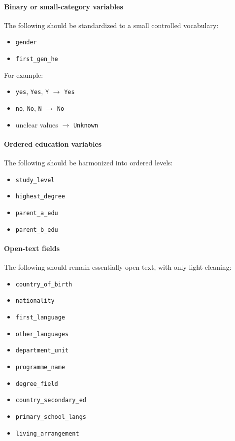 \documentclass[11pt]{article}
\begin{document}
\paragraph{Binary or small-category variables}
The following should be standardized to a small controlled vocabulary:
\begin{itemize}
    \item \texttt{gender}
    \item \texttt{first\_gen\_he}
\end{itemize}

For example:
\begin{itemize}
    \item \texttt{yes}, \texttt{Yes}, \texttt{Y} $\rightarrow$ \texttt{Yes}
    \item \texttt{no}, \texttt{No}, \texttt{N} $\rightarrow$ \texttt{No}
    \item unclear values $\rightarrow$ \texttt{Unknown}
\end{itemize}

\paragraph{Ordered education variables}
The following should be harmonized into ordered levels:
\begin{itemize}
    \item \texttt{study\_level}
    \item \texttt{highest\_degree}
    \item \texttt{parent\_a\_edu}
    \item \texttt{parent\_b\_edu}
\end{itemize}

\paragraph{Open-text fields}
The following should remain essentially open-text, with only light cleaning:
\begin{itemize}
    \item \texttt{country\_of\_birth}
    \item \texttt{nationality}
    \item \texttt{first\_language}
    \item \texttt{other\_languages}
    \item \texttt{department\_unit}
    \item \texttt{programme\_name}
    \item \texttt{degree\_field}
    \item \texttt{country\_secondary\_ed}
    \item \texttt{primary\_school\_langs}
    \item \texttt{living\_arrangement}
\end{itemize}
\end{document}
